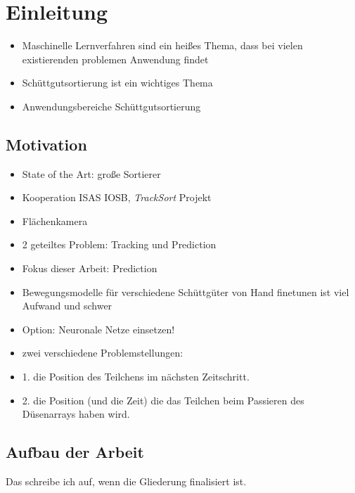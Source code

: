 \chapter{Einleitung}

\begin{itemize}
    \item Maschinelle Lernverfahren sind ein heißes Thema, dass bei vielen existierenden problemen Anwendung findet
    \item Schüttgutsortierung ist ein wichtiges Thema
    \item Anwendungsbereiche Schüttgutsortierung
    
\end{itemize}


\section{Motivation}

\begin{itemize}
    \item State of the Art: große Sortierer
    \item Kooperation ISAS IOSB, \textit{TrackSort} Projekt 
    \item Flächenkamera
    \item 2 geteiltes Problem: Tracking und Prediction
    \item Fokus dieser Arbeit: Prediction
    \item Bewegungsmodelle für verschiedene Schüttgüter von Hand finetunen ist viel Aufwand und schwer
    \item Option: Neuronale Netze einsetzen! 
    \item zwei verschiedene Problemstellungen:
    \item 1. die Position des Teilchens im nächsten Zeitschritt.
    \item 2. die Position (und die Zeit) die das Teilchen beim Passieren des Düsenarrays haben wird.
\end{itemize}


\section{Aufbau der Arbeit}

Das schreibe ich auf, wenn die Gliederung finalisiert ist.


